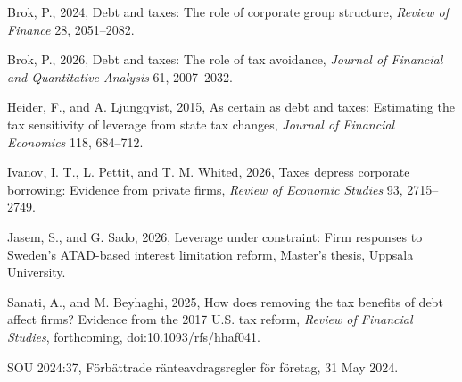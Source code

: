 \documentclass[12pt,a4paper]{article}
\newenvironment{refs}{\begin{list}{}{\setlength{\leftmargin}{1.5em}\setlength{\itemindent}{-1.5em}\setlength{\itemsep}{0pt}\setlength{\parsep}{0pt}}\small}{\end{list}}
\begin{document}
\begin{refs}
\item Brok, P., 2024, Debt and taxes: The role of corporate group structure, \emph{Review of Finance} 28, 2051--2082.
\item Brok, P., 2026, Debt and taxes: The role of tax avoidance, \emph{Journal of Financial and Quantitative Analysis} 61, 2007--2032.
\item Heider, F., and A. Ljungqvist, 2015, As certain as debt and taxes: Estimating the tax sensitivity of leverage from state tax changes, \emph{Journal of Financial Economics} 118, 684--712.
\item Ivanov, I. T., L. Pettit, and T. M. Whited, 2026, Taxes depress corporate borrowing: Evidence from private firms, \emph{Review of Economic Studies} 93, 2715--2749.
\item Jasem, S., and G. Sado, 2026, Leverage under constraint: Firm responses to Sweden's ATAD-based interest limitation reform, Master's thesis, Uppsala University.
\item Sanati, A., and M. Beyhaghi, 2025, How does removing the tax benefits of debt affect firms? Evidence from the 2017 U.S. tax reform, \emph{Review of Financial Studies}, forthcoming, doi:10.1093/rfs/hhaf041.
\item SOU 2024:37, F\"orb\"attrade r\"anteavdragsregler f\"or f\"oretag, 31 May 2024.
\end{refs}
\end{document}
